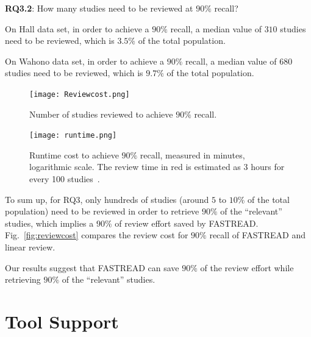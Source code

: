 \documentclass{svjour3}
\theoremstyle{break}
\begin{document}
\textbf{RQ3.2}: How many studies need to be reviewed at $90\%$ recall?

On Hall data set, in order to achieve a $90\%$ recall, a median value of $310$ studies need to be reviewed, which is $3.5\%$ of the total population.

On Wahono data set, in order to achieve a $90\%$ recall, a median value of $680$ studies need to be reviewed, which is $9.7\%$ of the total population.



\begin{figure}[t]
    \centering
    \begin{minipage}[t]{.48\linewidth}
    \texttt{[image: Reviewcost.png]}    
    \caption{Number of studies reviewed to achieve $90\%$ recall.}
    \label{fig:reviewcost}
    \end{minipage}
    \begin{minipage}[t]{.48\linewidth}
    \texttt{[image: runtime.png]}    
    \caption{Runtime cost to achieve $90\%$ recall, measured in minutes, logarithmic scale. The review time in red is estimated as 3 hours for every 100 studies~\cite{malheiros2007visual}.}
    \label{fig:runtime}
    
\end{minipage}
\end{figure}


    
To sum up, for RQ3, only hundreds of studies (around $5$ to $10\%$ of the total population) need to be reviewed in order to retrieve $90\%$ of the ``relevant'' studies, which implies a $90\%$ of review effort saved by FASTREAD. Fig.~\ref{fig:reviewcost} compares the review cost for $90\%$ recall of FASTREAD and linear review.

\begin{lesson}
    Our results suggest that FASTREAD can save $90\%$ of the review effort while retrieving $90\%$ of the ``relevant'' studies.
\end{lesson}








\section{Tool Support}
\label{sect: tool}
\end{document}
